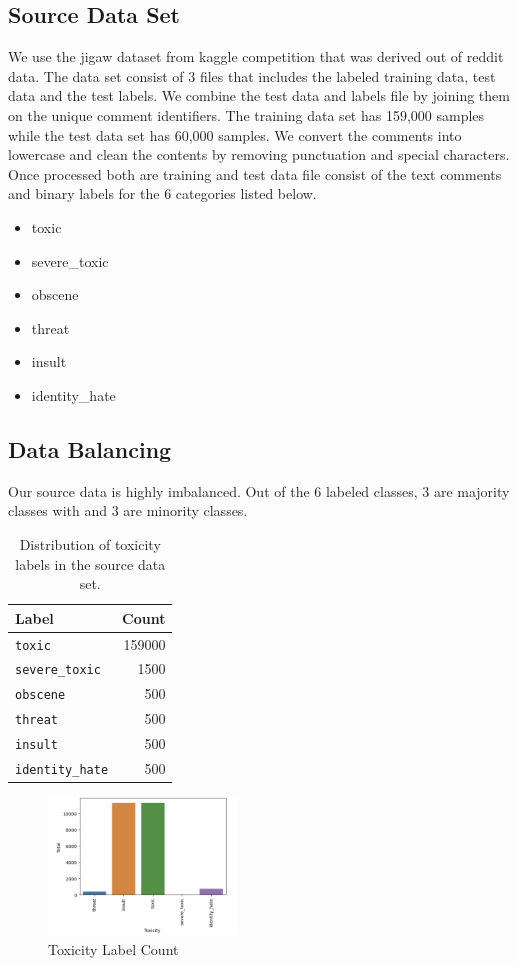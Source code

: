\documentclass[11pt,a4paper]{article}
\begin{document}
\subsection{Source Data Set}
We use the jigaw dataset from kaggle competition that was derived out of reddit data. The data set consist of 3 files that includes the labeled training data, test data and the test labels. We combine the test data and labels file by joining them on the unique comment identifiers. The training data set has 159,000 samples while the test data set has 60,000 samples. We convert the comments into lowercase and clean the contents by removing punctuation and special characters. Once processed both are training and test data file  consist of the text comments and binary labels for the 6 categories listed below.

\begin{itemize}
\item toxic
\item severe\_toxic
\item obscene
\item threat
\item insult
\item identity\_hate
\end{itemize}

\subsection{Data Balancing}
Our source data is highly imbalanced. Out of the 6 labeled classes, 3 are majority classes with and 3 are minority classes.
\begin{table}
\centering
\begin{tabular}{l r}
\hline
\textbf{Label} & \textbf{Count}\\
\hline
\verb|toxic| & 159000 \\
\verb|severe_toxic| & 1500 \\
\verb|obscene| & 500 \\ 
\verb|threat| & 500 \\ 
\verb|insult| & 500 \\
\verb|identity_hate| & 500 \\
\hline 
\end{tabular}
\caption{Distribution of toxicity labels in the source data set.}
\end{table}

\begin{figure}[h!]
\centering
\includegraphics[width=50mm,scale=0.5]{label_counts.png}
\caption{Toxicity Label Count}
\label{Fig1. label count vs toxicity}
\end{figure}
\end{document}
